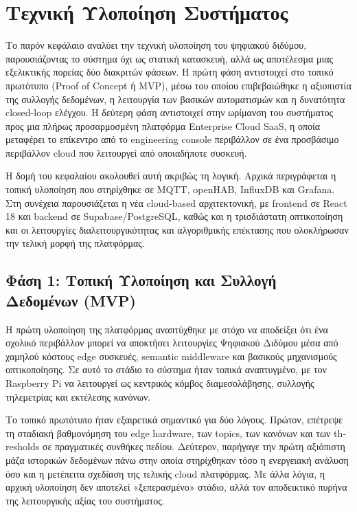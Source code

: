 \chapter{Τεχνική Υλοποίηση Συστήματος}
Το παρόν κεφάλαιο αναλύει την τεχνική υλοποίηση του ψηφιακού διδύμου, παρουσιάζοντας το σύστημα όχι ως στατική κατασκευή, αλλά ως αποτέλεσμα μιας εξελικτικής πορείας δύο διακριτών φάσεων. Η πρώτη φάση αντιστοιχεί στο τοπικό πρωτότυπο (\textlatin{Proof of Concept} ή \textlatin{MVP}), μέσω του οποίου επιβεβαιώθηκε η αξιοπιστία της συλλογής δεδομένων, η λειτουργία των βασικών αυτοματισμών και η δυνατότητα \textlatin{closed-loop} ελέγχου. Η δεύτερη φάση αντιστοιχεί στην ωρίμανση του συστήματος προς μια πλήρως προσαρμοσμένη πλατφόρμα \textlatin{Enterprise Cloud SaaS}, η οποία μεταφέρει το επίκεντρο από το \textlatin{engineering console} περιβάλλον σε ένα προσβάσιμο περιβάλλον \textlatin{cloud} που λειτουργεί από οποιαδήποτε συσκευή.

Η δομή του κεφαλαίου ακολουθεί αυτή ακριβώς τη λογική. Αρχικά περιγράφεται η τοπική υλοποίηση που στηρίχθηκε σε \textlatin{MQTT}, \textlatin{openHAB}, \textlatin{InfluxDB} και \textlatin{Grafana}. Στη συνέχεια παρουσιάζεται η νέα \textlatin{cloud-based} αρχιτεκτονική, με \textlatin{frontend} σε \textlatin{React 18} και \textlatin{backend} σε \textlatin{Supabase/PostgreSQL}, καθώς και η τρισδιάστατη οπτικοποίηση και οι λειτουργίες διαλειτουργικότητας και αλγοριθμικής επέκτασης που ολοκλήρωσαν την τελική μορφή της πλατφόρμας.

\section{\texorpdfstring{Φάση 1: Τοπική Υλοποίηση και Συλλογή Δεδομένων (\textlatin{MVP})}{Φάση 1: Τοπική Υλοποίηση και Συλλογή Δεδομένων (MVP)}}
Η πρώτη υλοποίηση της πλατφόρμας αναπτύχθηκε με στόχο να αποδείξει ότι ένα σχολικό περιβάλλον μπορεί να αποκτήσει λειτουργίες Ψηφιακού Διδύμου μέσα από χαμηλού κόστους \textlatin{edge} συσκευές, \textlatin{semantic middleware} και βασικούς μηχανισμούς οπτικοποίησης. Σε αυτό το στάδιο το σύστημα ήταν τοπικά αναπτυγμένο, με τον \textlatin{Raspberry Pi} να λειτουργεί ως κεντρικός κόμβος διαμεσολάβησης, συλλογής τηλεμετρίας και εκτέλεσης κανόνων.

Το τοπικό πρωτότυπο ήταν εξαιρετικά σημαντικό για δύο λόγους. Πρώτον, επέτρεψε τη σταδιακή βαθμονόμηση του \textlatin{edge hardware}, των \textlatin{topics}, των κανόνων και των \textlatin{thresholds} σε πραγματικές συνθήκες πεδίου. Δεύτερον, παρήγαγε την πρώτη αξιόπιστη μάζα ιστορικών δεδομένων πάνω στην οποία στηρίχθηκαν τόσο η ενεργειακή ανάλυση όσο και η μετέπειτα σχεδίαση της τελικής \textlatin{cloud} πλατφόρμας. Με άλλα λόγια, η αρχική υλοποίηση δεν αποτελεί «ξεπερασμένο» στάδιο, αλλά τον αποδεικτικό πυρήνα της λειτουργικής αξίας του συστήματος.

